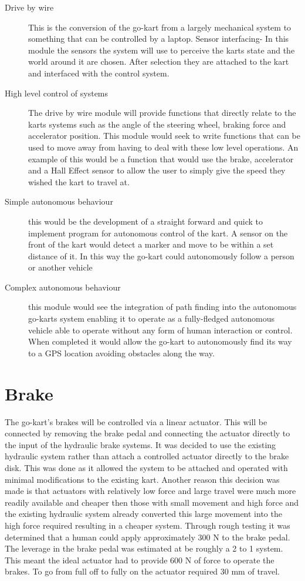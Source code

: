 \begin{description}
\item[Drive by wire] This is the conversion of the go-kart from a largely mechanical system to something that can be controlled by a laptop. 
Sensor interfacing- In this module the sensors the system will use to perceive the karts state and the world around it are chosen. After selection they are attached to the kart and interfaced with the control system. 

\item[High level control of systems] The drive by wire module will provide functions that directly relate to the karts systems such as the angle of the steering wheel, braking force and accelerator position. This module would seek to write functions that can be used to move away from having to deal with these low level operations. An example of this would be a function that would use the brake, accelerator and a Hall Effect sensor to allow the user to simply give the speed they wished the kart to travel at.  

\item[Simple autonomous behaviour] this would be the development of a straight forward and quick to implement program for autonomous control of the kart. A sensor on the front of the kart would detect a marker and move to be within a set distance of it. In this way the go-kart could autonomously follow a person or another vehicle

\item[Complex autonomous behaviour] this module would see the integration of path finding into the autonomous go-karts system enabling it to operate as a fully-fledged autonomous vehicle able to operate without any form of human interaction or control. When completed it would allow the go-kart to autonomously find its way to a GPS location avoiding obstacles along the way.
\end{description}

\section{Brake}

The go-kart's brakes will be controlled via a linear actuator. This will be
connected by removing the brake pedal and connecting the actuator directly to
the input of the hydraulic brake systems. It was decided to use the existing
hydraulic system rather than attach a controlled actuator directly to the brake
disk. This was done as it allowed the system to be attached and operated with
minimal modifications to the existing kart. Another reason this decision was
made is that actuators with relatively low force and large travel were much more
readily available and cheaper then those with small movement and high force and
the existing hydraulic system already converted this large movement into the
high force required resulting in a cheaper system. Through rough testing it was
determined that a human could apply approximately 300 N to the brake pedal. The
leverage in the brake pedal was estimated at be roughly a 2 to 1 system. This
meant the ideal actuator had to provide 600 N of force to operate the brakes. To
go from full off to fully on the actuator required 30 mm of travel.

